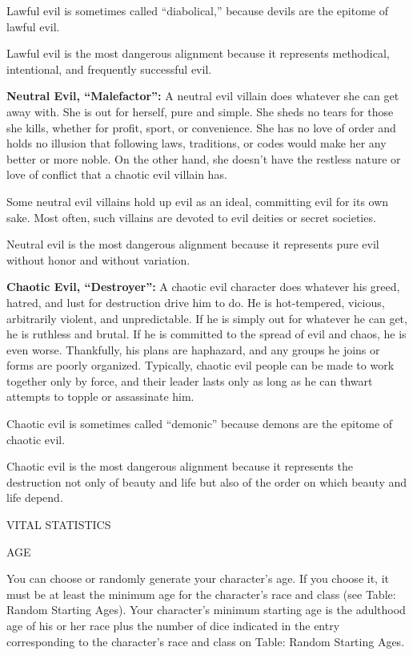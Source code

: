 \documentclass{article}
\begin{document}
Lawful evil is sometimes called ``diabolical,'' because devils are the epitome 
of lawful evil.

Lawful evil is the most dangerous alignment because it represents methodical, intentional, 
and frequently successful evil.

\vspace{12pt}
\textbf{Neutral Evil, ``Malefactor'':} A neutral evil villain does whatever she 
can get away with. She is out for herself, pure and simple. She sheds no tears 
for those she kills, whether for profit, sport, or convenience. She has no love 
of order and holds no illusion that following laws, traditions, or codes would 
make her any better or more noble. On the other hand, she doesn't have the restless 
nature or love of conflict that a chaotic evil villain has.

Some neutral evil villains hold up evil as an ideal, committing evil for its own 
sake. Most often, such villains are devoted to evil deities or secret societies.

Neutral evil is the most dangerous alignment because it represents pure evil without 
honor and without variation.

\vspace{12pt}
\textbf{Chaotic Evil, ``Destroyer'': }A chaotic evil character does whatever his 
greed, hatred, and lust for destruction drive him to do. He is hot-tempered, vicious, 
arbitrarily violent, and unpredictable. If he is simply out for whatever he can 
get, he is ruthless and brutal. If he is committed to the spread of evil and chaos, 
he is even worse. Thankfully, his plans are haphazard, and any groups he joins 
or forms are poorly organized. Typically, chaotic evil people can be made to work 
together only by force, and their leader lasts only as long as he can thwart attempts 
to topple or assassinate him.

Chaotic evil is sometimes called ``demonic'' because demons are the epitome of 
chaotic evil.

Chaotic evil is the most dangerous alignment because it represents the destruction 
not only of beauty and life but also of the order on which beauty and life depend.

\vspace{12pt}
{\LARGE{}VITAL STATISTICS}

\vspace{12pt}
AGE

You can choose or randomly generate your character's age. If you choose it, it 
must be at least the minimum age for the character's race and class (see Table: 
Random Starting Ages). Your character's minimum starting age is the adulthood age 
of his or her race plus the number of dice indicated in the entry corresponding 
to the character's race and class on Table: Random Starting Ages.
\end{document}
